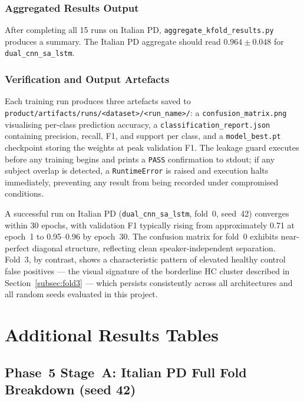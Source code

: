 \documentclass[oneside,openany]{final_report}
\begin{document}
\subsection*{Aggregated Results Output}

After completing all 15 runs on Italian PD, \texttt{aggregate\_kfold\_results.py} produces a summary. The Italian PD aggregate should read $0.964 \pm 0.048$ for \texttt{dual\_cnn\_sa\_lstm}.

\subsection*{Verification and Output Artefacts}

Each training run produces three artefacts saved to \texttt{product/artifacts/runs/<dataset>/<run\_name>/}: a \texttt{confusion\_matrix.png} visualising per-class prediction accuracy, a \texttt{classification\_report.json} containing precision, recall, F1, and support per class, and a \texttt{model\_best.pt} checkpoint storing the weights at peak validation F1. The leakage guard executes before any training begins and prints a \texttt{PASS} confirmation to stdout; if any subject overlap is detected, a \texttt{RuntimeError} is raised and execution halts immediately, preventing any result from being recorded under compromised conditions.

A successful run on Italian PD (\texttt{dual\_cnn\_sa\_lstm}, fold~0, seed~42) converges within 30 epochs, with validation F1 typically rising from approximately 0.71 at epoch~1 to 0.95--0.96 by epoch~30. The confusion matrix for fold~0 exhibits near-perfect diagonal structure, reflecting clean speaker-independent separation. Fold~3, by contrast, shows a characteristic pattern of elevated healthy control false positives --- the visual signature of the borderline HC cluster described in Section~\ref{subsec:fold3} --- which persists consistently across all architectures and all random seeds evaluated in this project.

\chapter{Additional Results Tables}

\section{Phase~5 Stage~A: Italian PD Full Fold Breakdown (seed 42)}
\end{document}
